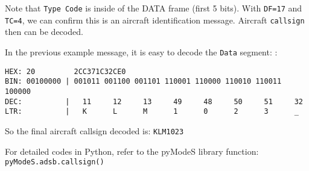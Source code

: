 Note that \texttt{Type\ Code} is inside of the DATA frame (first 5 bits). With \texttt{DF=17} and \texttt{TC=4}, we can confirm this is an aircraft identification message. Aircraft \texttt{callsign} then can be decoded.

In the previous example message, it is easy to decode the \texttt{Data} segment: :

\begin{verbatim}
HEX: 20         2CC371C32CE0
BIN: 00100000 | 001011 001100 001101 110001 110000 110010 110011 100000
DEC:          |   11     12     13     49     48     50     51     32
LTR:          |   K      L      M      1      0      2      3      _
\end{verbatim}

So the final aircraft callsign decoded is: \texttt{KLM1023}

For detailed codes in Python, refer to the pyModeS library function: \texttt{pyModeS.adsb.callsign()}
